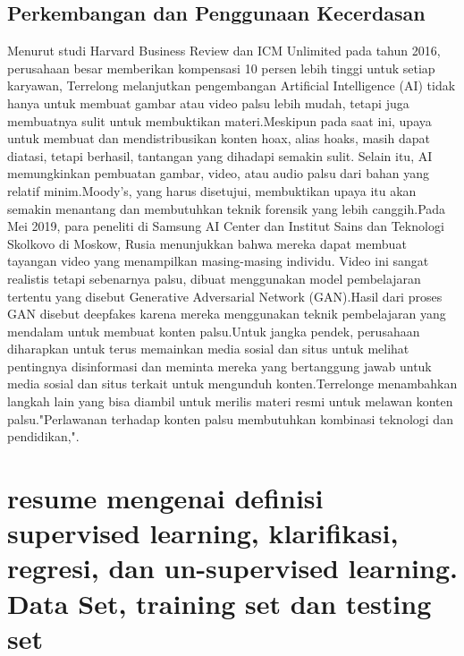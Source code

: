 \subsection{Perkembangan dan Penggunaan Kecerdasan}
Menurut studi Harvard Business Review dan ICM Unlimited pada tahun 2016, perusahaan besar memberikan kompensasi 10 persen lebih tinggi untuk setiap karyawan, Terrelong melanjutkan pengembangan Artificial Intelligence (AI) tidak hanya untuk membuat gambar atau video palsu lebih mudah, tetapi juga membuatnya sulit untuk membuktikan materi.Meskipun pada saat ini, upaya untuk membuat dan mendistribusikan konten hoax, alias hoaks, masih dapat diatasi, tetapi berhasil, tantangan yang dihadapi semakin sulit. Selain itu, AI memungkinkan pembuatan gambar, video, atau audio palsu dari bahan yang relatif minim.Moody's, yang harus disetujui, membuktikan upaya itu akan semakin menantang dan membutuhkan teknik forensik yang lebih canggih.Pada Mei 2019, para peneliti di Samsung AI Center dan Institut Sains dan Teknologi Skolkovo di Moskow, Rusia menunjukkan bahwa mereka dapat membuat tayangan video yang menampilkan masing-masing individu. Video ini sangat realistis tetapi sebenarnya palsu, dibuat menggunakan model pembelajaran tertentu yang disebut Generative Adversarial Network (GAN).Hasil dari proses GAN disebut deepfakes karena mereka menggunakan teknik pembelajaran yang mendalam untuk membuat konten palsu.Untuk jangka pendek, perusahaan diharapkan untuk terus memainkan media sosial dan situs untuk melihat pentingnya disinformasi dan meminta mereka yang bertanggung jawab untuk media sosial dan situs terkait untuk mengunduh konten.Terrelonge menambahkan langkah lain yang bisa diambil untuk merilis materi resmi untuk melawan konten palsu."Perlawanan terhadap konten palsu membutuhkan kombinasi teknologi dan pendidikan,".
\section{resume mengenai definisi supervised learning, klarifikasi, regresi, dan un-supervised learning. Data Set, training set dan testing set}

